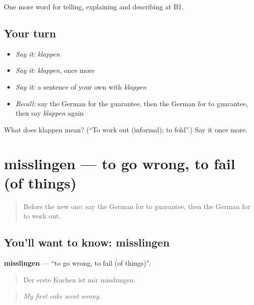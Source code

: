 \begin{grammarlens}[title={What you've built}]
One more word for telling, explaining and describing at B1.
\end{grammarlens}

\subsection*{Your turn}
\begin{itemize}
\raggedright
  \item \emph{Say it:} \emph{klappen}
  \item \emph{Say it:} \emph{klappen}, once more
  \item \emph{Say it:} a sentence of your own with \emph{klappen}
  \item \emph{Recall:} say the German for the guarantee, then the German for to guarantee, then say \emph{klappen} again
\end{itemize}

\begin{tcolorbox}[breakable,colback=teal!4,colframe=teal!35!black,title={Before you move on}]
What does klappen mean? (\textquotedblleft{}To work out (informal); to fold\textquotedblright{}.) Say it once more.
\end{tcolorbox}
\section[misslingen]{misslingen — to go wrong, to fail (of things)}

\label{lesson:GE-C370-misslingen}



\begin{quote}
Before the new one: say the German for to guarantee, then the German for to work out.
\end{quote}

\subsection*{You'll want to know: misslingen}
\textbf{misslingen} — \textquotedblleft{}to go wrong, to fail (of things)\textquotedblright{}.

\begin{quote}
Der erste Kuchen ist mir misslungen.
\end{quote}

\begin{quote}
\emph{My first cake went wrong.}
\end{quote}

